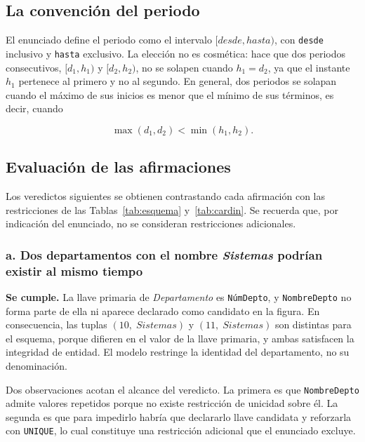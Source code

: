 \subsection{La convención del periodo}

El enunciado define el periodo como el intervalo $[desde, hasta)$, con
\texttt{desde} inclusivo y \texttt{hasta} exclusivo. La elección no es
cosmética: hace que dos periodos consecutivos, $[d_1, h_1)$ y $[d_2, h_2)$, no
se solapen cuando $h_1 = d_2$, ya que el instante $h_1$ pertenece al primero y
no al segundo. En general, dos periodos se solapan cuando el máximo de sus
inicios es menor que el mínimo de sus términos, es decir, cuando

\begin{equation}
  \max(d_1, d_2) < \min(h_1, h_2).
\end{equation}

\subsection{Evaluación de las afirmaciones}
\label{sec:ej4}

Los veredictos siguientes se obtienen contrastando cada afirmación con las
restricciones de las Tablas~\ref{tab:esquema} y~\ref{tab:cardin}. Se recuerda
que, por indicación del enunciado, no se consideran restricciones adicionales.

\subsubsection*{a. Dos departamentos con el nombre \emph{Sistemas} podrían existir al mismo tiempo}

\textbf{Se cumple.} La llave primaria de \emph{Departamento} es
\texttt{NúmDepto}, y \texttt{NombreDepto} no forma parte de ella ni aparece
declarado como candidato en la figura. En consecuencia, las tuplas $(10,\;
\mathit{Sistemas})$ y $(11,\; \mathit{Sistemas})$ son distintas para el
esquema, porque difieren en el valor de la llave primaria, y ambas satisfacen
la integridad de entidad. El modelo restringe la identidad del departamento,
no su denominación.

Dos observaciones acotan el alcance del veredicto. La primera es que
\texttt{NombreDepto} admite valores repetidos porque no existe restricción de
unicidad sobre él. La segunda es que para impedirlo habría que declararlo
llave candidata y reforzarla con \texttt{UNIQUE}, lo cual constituye una
restricción adicional que el enunciado excluye.

